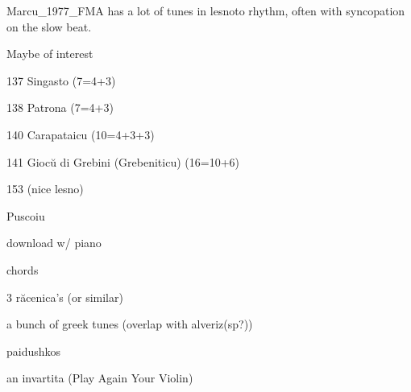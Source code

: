 
Marcu_1977_FMA has a lot of tunes in lesnoto rhythm, often with syncopation on the slow beat.

Maybe of interest
\item{137} Singasto (7=4+3)
\item{138} Patrona (7=4+3)
\item{140} Carapataicu (10=4+3+3)
\item{141} Giocŭ di Grebini (Grebeniticu) (16=10+6)
\item{153} (nice lesno)


Puscoiu
\item download w/ piano
\item chords
\item 3 răcenica's (or similar)
\item a bunch of greek tunes (overlap with alveriz(sp?))
\item paidushkos
\item an invartita (Play Again Your Violin)
